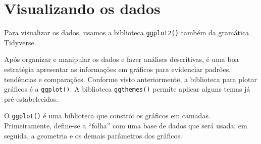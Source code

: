 \documentclass[
  10pt,
  brazil,
  a4paper,
  twoside, notitlepage, openright]{book}
\newenvironment{Shaded}{\begin{snugshade}}{\end{snugshade}}
\newcommand{\CommentTok}[1]{\textcolor[rgb]{0.56,0.35,0.01}{\textit{#1}}}
\newcommand{\DataTypeTok}[1]{\textcolor[rgb]{0.13,0.29,0.53}{#1}}
\newcommand{\DecValTok}[1]{\textcolor[rgb]{0.00,0.00,0.81}{#1}}
\newcommand{\KeywordTok}[1]{\textcolor[rgb]{0.13,0.29,0.53}{\textbf{#1}}}
\newcommand{\NormalTok}[1]{#1}
\newcommand{\OperatorTok}[1]{\textcolor[rgb]{0.81,0.36,0.00}{\textbf{#1}}}
\newcommand{\StringTok}[1]{\textcolor[rgb]{0.31,0.60,0.02}{#1}}
\begin{document}
\begin{Shaded}
\end{Shaded}

\hypertarget{visualizando-os-dados}{%
\chapter{Visualizando os dados}\label{visualizando-os-dados}}

Para visualizar os dados, usamos a biblioteca \texttt{ggplot2()} também da gramática Tidyverse.

Após organizar e manipular os dados e fazer análises descritivas, é uma boa estratégia apresentar as informações em gráficos para evidenciar padrões, tendências e comparações. Conforme visto anteriormente, a biblioteca para plotar gráficos é a \texttt{ggplot()}. A biblioteca \texttt{ggthemes()} permite aplicar alguns temas já pré-estabelecidos.

O \texttt{ggplot()} é uma biblioteca que constrói os gráficos em camadas. Primeiramente, define-se a ``folha'' com uma base de dados que será usada; em seguida, a geometria e os demais parâmetros dos gráficos.
\end{document}
